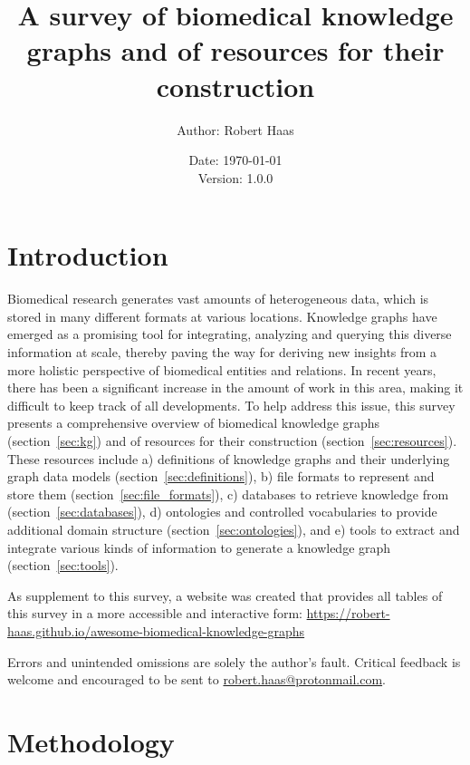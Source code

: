 \documentclass{article}
\title{\vspace{-2em}A survey of biomedical knowledge graphs and of resources for their construction}
\author{Author: Robert Haas}
\date{Date: \today\\[1em]Version: 1.0.0}
\begin{document}
	
\maketitle

\tableofcontents





\section{Introduction}

Biomedical research generates vast amounts of heterogeneous data, which is stored in many different formats at various locations. Knowledge graphs have emerged as a promising tool for integrating, analyzing and querying this diverse information at scale, thereby paving the way for deriving new insights from a more holistic perspective of biomedical entities and relations.
In recent years, there has been a significant increase in the amount of work in this area, making it difficult to keep track of all developments.
To help address this issue, this survey presents a comprehensive overview of biomedical knowledge graphs (section~\ref{sec:kg}) and of resources for their construction (section~\ref{sec:resources}). These resources include a) definitions of knowledge graphs and their underlying graph data models (section~\ref{sec:definitions}), b) file formats to represent and store them (section~\ref{sec:file_formats}), c) databases to retrieve knowledge from (section~\ref{sec:databases}), d) ontologies and controlled vocabularies to provide additional domain structure (section~\ref{sec:ontologies}), and e) tools to extract and integrate various kinds of information to generate a knowledge graph (section~\ref{sec:tools}).

\vspace{1em}
As supplement to this survey, a website was created that provides all tables of this survey in a more accessible and interactive form: \url{https://robert-haas.github.io/awesome-biomedical-knowledge-graphs}

\vspace{1em}
Errors and unintended omissions are solely the author's fault. Critical feedback is welcome and encouraged to be sent to \href{mailto:robert.haas@protonmail.com}{robert.haas@protonmail.com}.





\newpage
\section{Methodology}
\end{document}
